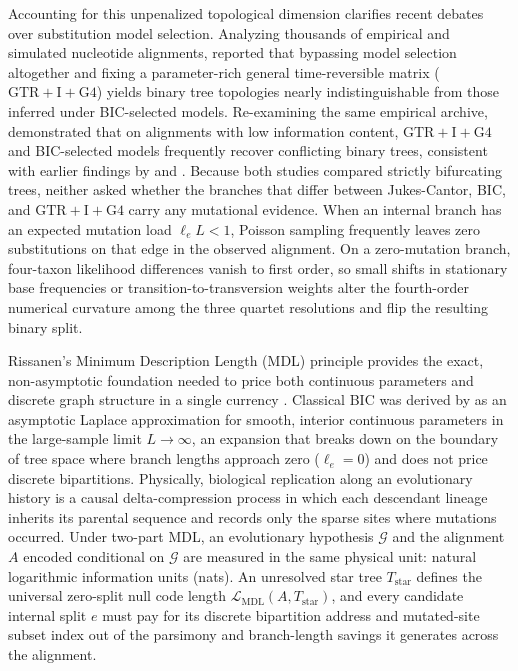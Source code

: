 \documentclass[11pt,a4paper]{article}
\begin{document}
Accounting for this unpenalized topological dimension clarifies recent debates over substitution model selection. Analyzing thousands of empirical and simulated nucleotide alignments, \citet{abadi2019model} reported that bypassing model selection altogether and fixing a parameter-rich general time-reversible matrix ($\text{GTR}+\text{I}+\text{G4}$) yields binary tree topologies nearly indistinguishable from those inferred under BIC-selected models. Re-examining the same empirical archive, \citet{gerth2019cannot} demonstrated that on alignments with low information content, $\text{GTR}+\text{I}+\text{G4}$ and BIC-selected models frequently recover conflicting binary trees, consistent with earlier findings by \citet{ripplinger2008does} and \citet{spielman2020relative}. Because both studies compared strictly bifurcating trees, neither asked whether the branches that differ between Jukes-Cantor, BIC, and $\text{GTR}+\text{I}+\text{G4}$ carry any mutational evidence. When an internal branch has an expected mutation load $\ell_e L < 1$, Poisson sampling frequently leaves zero substitutions on that edge in the observed alignment. On a zero-mutation branch, four-taxon likelihood differences vanish to first order, so small shifts in stationary base frequencies or transition-to-transversion weights alter the fourth-order numerical curvature among the three quartet resolutions and flip the resulting binary split.

Rissanen's Minimum Description Length (MDL) principle provides the exact, non-asymptotic foundation needed to price both continuous parameters and discrete graph structure in a single currency \citep{rissanen1978modeling,rissanen1983universal}. Classical BIC was derived by \citet{schwarz1978estimating} as an asymptotic Laplace approximation for smooth, interior continuous parameters in the large-sample limit $L \to \infty$, an expansion that breaks down on the boundary of tree space where branch lengths approach zero ($\ell_e = 0$) and does not price discrete bipartitions. Physically, biological replication along an evolutionary history is a causal delta-compression process in which each descendant lineage inherits its parental sequence and records only the sparse sites where mutations occurred. Under two-part MDL, an evolutionary hypothesis $\mathcal{G}$ and the alignment $A$ encoded conditional on $\mathcal{G}$ are measured in the same physical unit: natural logarithmic information units (nats). An unresolved star tree $T_{\text{star}}$ defines the universal zero-split null code length $\mathcal{L}_{\text{MDL}}(A, T_{\text{star}})$, and every candidate internal split $e$ must pay for its discrete bipartition address and mutated-site subset index out of the parsimony and branch-length savings it generates across the alignment.
\end{document}
